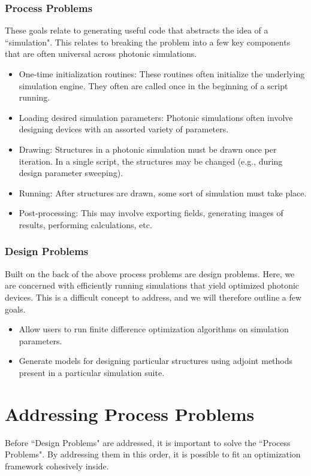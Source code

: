 \documentclass[12pt]{article}
\begin{document}
\subsubsection{Process Problems}
These goals relate to generating useful code that abstracts the idea of a ``simulation". This relates to breaking the problem into a few key components that are often universal across photonic simulations.
\begin{itemize}
\item One-time initialization routines: These routines often initialize the underlying simulation engine. They often are called once in the beginning of a script running. 
\item Loading desired simulation parameters: Photonic simulations often involve designing devices with an assorted variety of parameters. 
\item Drawing: Structures in a photonic simulation must be drawn once per iteration. In a single script, the structures may be changed (e.g., during design parameter sweeping).
\item Running: After structures are drawn, some sort of simulation must take place.
\item Post-processing: This may involve exporting fields, generating images of results, performing calculations, etc.
\end{itemize}

\subsubsection{Design Problems}
Built on the back of the above process problems are design problems. Here, we are concerned with efficiently running simulations that yield optimized photonic devices. This is a difficult concept to address, and we will therefore outline a few goals.
\begin{itemize}
\item Allow users to run finite difference optimization algorithms on simulation parameters.
\item Generate models for designing particular structures using adjoint methods present in a particular simulation suite.
\end{itemize}

\section{Addressing Process Problems}
Before ``Design Problems" are addressed, it is important to solve the ``Process Problems". By addressing them in this order, it is possible to fit an optimization framework cohesively inside.
\end{document}
